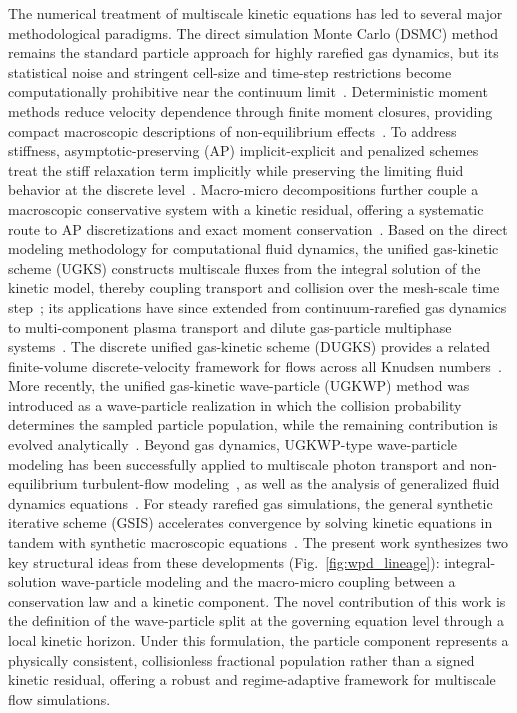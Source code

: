 \documentclass[preprint,12pt]{elsarticle}
\begin{document}
The numerical treatment of multiscale kinetic equations has led to several major methodological paradigms. The direct simulation Monte Carlo (DSMC) method remains the standard particle approach for highly rarefied gas dynamics, but its statistical noise and stringent cell-size and time-step restrictions become computationally prohibitive near the continuum limit~\cite{bird1994}. Deterministic moment methods reduce velocity dependence through finite moment closures, providing compact macroscopic descriptions of non-equilibrium effects~\cite{grad1949}. To address stiffness, asymptotic-preserving (AP) implicit-explicit and penalized schemes treat the stiff relaxation term implicitly while preserving the limiting fluid behavior at the discrete level~\cite{pareschi2005,filbet2010}. Macro-micro decompositions further couple a macroscopic conservative system with a kinetic residual, offering a systematic route to AP discretizations and exact moment conservation~\cite{liu2004,gamba2019}.
Based on the direct modeling methodology for computational fluid dynamics, the unified gas-kinetic scheme (UGKS) constructs multiscale fluxes from the integral solution of the kinetic model, thereby coupling transport and collision over the mesh-scale time step~\cite{xu2014direct,xu2010,huang2012ugks}; its applications have since extended from continuum-rarefied gas dynamics to multi-component plasma transport and dilute gas-particle multiphase systems~\cite{liu2017plasma,liu2019multiphase}. The discrete unified gas-kinetic scheme (DUGKS) provides a related finite-volume discrete-velocity framework for flows across all Knudsen numbers~\cite{guo2013}. More recently, the unified gas-kinetic wave-particle (UGKWP) method was introduced as a wave-particle realization in which the collision probability determines the sampled particle population, while the remaining contribution is evolved analytically~\cite{liu2020ugkwp,zhu2019ugkwp}. Beyond gas dynamics, UGKWP-type wave-particle modeling has been successfully applied to multiscale photon transport and non-equilibrium turbulent-flow modeling~\cite{li2020ugkwp,liu2021,yang2026turbulence}, as well as the analysis of generalized fluid dynamics equations~\cite{guo2026}. For steady rarefied gas simulations, the general synthetic iterative scheme (GSIS) accelerates convergence by solving kinetic equations in tandem with synthetic macroscopic equations~\cite{su2020,luo2024}.
The present work synthesizes two key structural ideas from these developments (Fig.~\ref{fig:wpd_lineage}): integral-solution wave-particle modeling and the macro-micro coupling between a conservation law and a kinetic component. The novel contribution of this work is the definition of the wave-particle split at the governing equation level through a local kinetic horizon. Under this formulation, the particle component represents a physically consistent, collisionless fractional population rather than a signed kinetic residual, offering a robust and regime-adaptive framework for multiscale flow simulations.
\end{document}
